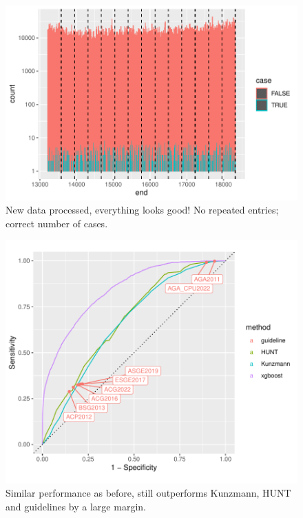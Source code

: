 \documentclass[12pt]{article}
\begin{document}
\begin{figure}[h]
\centering
\includegraphics[width=\textwidth]{figures/histogram.pdf}
\caption{New data processed, everything looks good! No repeated entries;
correct number of cases.}
\end{figure}


\begin{figure}[h]
\centering
\includegraphics[width=\textwidth]{figures/comparison.pdf}
\caption{Similar performance as before, still outperforms Kunzmann, HUNT and
guidelines by a large margin.}
\end{figure}
\end{document}
